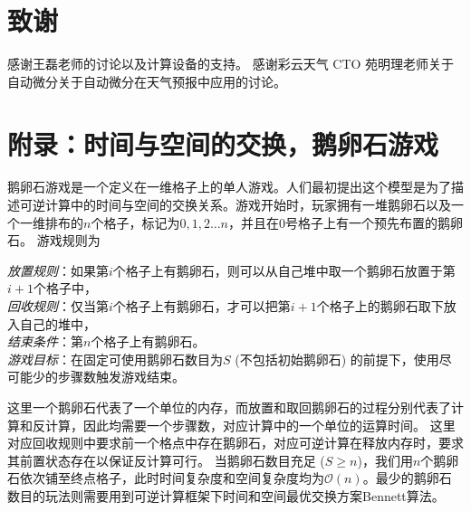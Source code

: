 \documentclass[A4,twoside,UTF8]{ctexart}
\newcommand{\bigO}{{\mathcal{O}}}
\begin{document}
\section*{致谢}

感谢王磊老师的讨论以及计算设备的支持。
感谢彩云天气 CTO 苑明理老师关于自动微分关于自动微分在天气预报中应用的讨论。

\section*{附录：时间与空间的交换，鹅卵石游戏}\label{sec:pebblegame}
鹅卵石游戏是一个定义在一维格子上的单人游戏。人们最初提出这个模型是为了描述可逆计算中的时间与空间的交换关系。游戏开始时，玩家拥有一堆鹅卵石以及一个一维排布的$n$个格子，标记为$0,1,2\ldots n$，并且在$0$号格子上有一个预先布置的鹅卵石。
游戏规则为
\begin{tcolorbox}[width=\textwidth, title=鹅卵石游戏-可逆计算版本]
    \textit{放置规则}：如果第$i$个格子上有鹅卵石，则可以从自己堆中取一个鹅卵石放置于第$i+1$个格子中，\\
    \textit{回收规则}：仅当第$i$个格子上有鹅卵石，才可以把第$i+1$个格子上的鹅卵石取下放入自己的堆中，\\
    \textit{结束条件}：第$n$个格子上有鹅卵石。\\
    \textit{游戏目标}：在固定可使用鹅卵石数目为$S$ (不包括初始鹅卵石) 的前提下，使用尽可能少的步骤数触发游戏结束。
\end{tcolorbox}
这里一个鹅卵石代表了一个单位的内存，而放置和取回鹅卵石的过程分别代表了计算和反计算，因此均需要一个步骤数，对应计算中的一个单位的运算时间。
这里对应回收规则中要求前一个格点中存在鹅卵石，对应可逆计算在释放内存时，要求其前置状态存在以保证反计算可行。
当鹅卵石数目充足 ($S\geq n$)，我们用$n$个鹅卵石依次铺至终点格子，此时时间复杂度和空间复杂度均为$\bigO(n)$。最少的鹅卵石数目的玩法则需要用到可逆计算框架下时间和空间最优交换方案Bennett算法。
\end{document}
